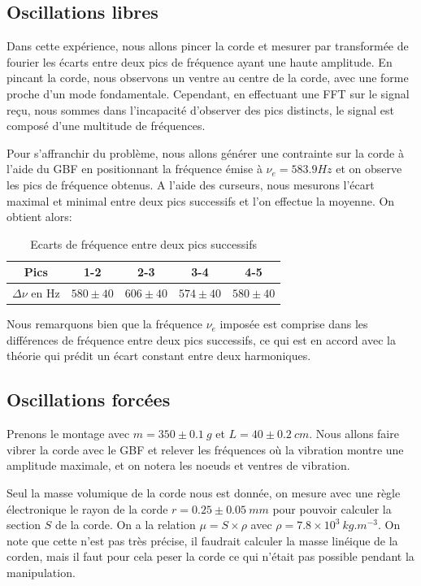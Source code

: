 \documentclass[12pt]{article}
\begin{document}
\subsection{Oscillations libres}
Dans cette expérience, nous allons pincer la corde et mesurer par transformée de fourier les écarts entre deux pics de fréquence ayant une haute amplitude.
En pincant la corde, nous observons un ventre au centre de la corde, avec une forme proche d'un mode fondamentale. Cependant, en effectuant une FFT sur le signal reçu,
nous sommes dans l'incapacité d'observer des pics distincts, le signal est composé d'une multitude de fréquences.

Pour s'affranchir du problème, nous allons générer une contrainte sur la corde à l'aide du GBF en positionnant la fréquence émise à $\nu_e = 583.9 Hz$ et on observe
les pics de fréquence obtenus. A l'aide des curseurs, nous mesurons l'écart maximal et minimal entre deux pics successifs et l'on effectue la moyenne. On obtient alors:

\begin{table}[h!]
	\centering
	\begin{tabular}{||c c c c c||} 
		\hline
		Pics & 1-2 & 2-3 & 3-4 & 4-5 \\
		\hline
        $\Delta \nu$ en Hz & $580 \pm 40$ & $606 \pm 40$ & $574 \pm 40$ & $580 \pm 40$ \\
		\hline
	\end{tabular}
	\caption{Ecarts de fréquence entre deux pics successifs}
	\label{table:1}
\end{table}

Nous remarquons bien que la fréquence $\nu_e$ imposée est comprise dans les différences de fréquence entre deux pics successifs, ce qui est en accord avec la théorie qui prédit 
un écart constant entre deux harmoniques.

\break
\subsection{Oscillations forcées}
Prenons le montage avec $m=350 \pm 0.1 \ g$ et $L=40 \pm 0.2 \ cm$. Nous allons faire vibrer la corde avec le GBF et relever les fréquences où la vibration montre une amplitude
maximale, et on notera les noeuds et ventres de vibration.

Seul la masse volumique de la corde nous est donnée, on mesure avec une règle électronique le rayon de la corde $r=0.25 \pm  0.05 \ mm$ pour pouvoir calculer la section $S$ de la corde. On a la relation $\mu= S \times \rho$ avec $\rho = 7.8 \times 10^3 \ kg.m^{-3}$.
On note que cette n'est pas très précise, il faudrait calculer la masse linéique de la corden, mais il faut pour cela peser la corde ce qui n'était pas possible pendant la manipulation.
\end{document}
